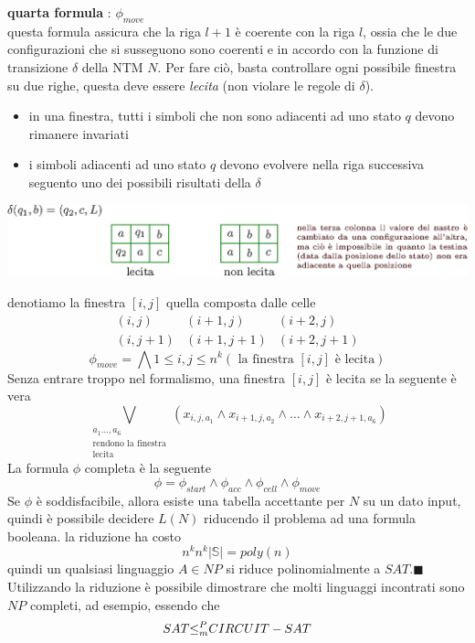 \documentclass[10pt, letterpaper]{report}
\begin{document}
\textbf{quarta formula} : $\phi_{move}$\\
questa formula assicura che la riga $l+1$ è coerente con la riga $l$, ossia che le due configurazioni che si susseguono sono coerenti e in accordo con la funzione di transizione $\delta$ della NTM $N$. Per fare ciò, basta controllare ogni possibile finestra su due righe, questa deve essere \textit{lecita} (non violare le regole di $\delta$).\begin{itemize}
    \item in una finestra, tutti i simboli che non sono adiacenti ad uno stato $q$ devono rimanere invariati 
    \item i simboli adiacenti ad uno stato $q$ devono evolvere nella riga successiva seguento uno dei possibili risultati della $\delta$
\end{itemize}\begin{center}
    \includegraphics[width=\textwidth ]{images/finestraLecita.eps}
\end{center}
denotiamo la finestra $[i,j]$ quella composta dalle celle$$ \begin{matrix}
    (i,j) & (i+1,j) & (i+2,j)\\ 
    (i,j+1) & (i+1,j+1) & (i+2,j+1)
\end{matrix}$$
$$ \phi_{move}=\bigwedge\limits{1 \leq i,j \leq n^k}
(\text{ la finestra $[i,j]$ è lecita})$$
Senza entrare troppo nel formalismo, una finestra $[i,j]$ è lecita se la seguente è vera 
$$ \bigvee_{\begin{matrix}
a_1\dots,a_6\\ 
\text{rendono la finestra}\\\text{lecita}
\end{matrix}}
(x_{i,j,a_1}\land x_{i+1,j,a_2}\land \dots \land x_{i+2,j+1,a_6})
$$
La formula $\phi$ completa è la seguente
$$ \phi = \phi_{start}\land \phi_{acc}\land \phi_{cell}\land \phi_{move}$$
Se $\phi$ è soddisfacibile, allora esiste una tabella accettante per $N$ su un dato input, quindi è possibile decidere $L(N)$ riducendo il problema ad una formula booleana.
la riduzione ha costo $$ n^kn^k|\mathbb S|=poly(n)$$
quindi un qualsiasi linguaggio $A\in NP$ si riduce polinomialmente a $SAT$.\hfill$\blacksquare$\acc   
Utilizzando la riduzione è possibile dimostrare che molti linguaggi incontrati sono $NP$ completi, ad esempio, essendo che $$ SAT{\le_m^P} CIRCUIT-SAT$$
\end{document}
